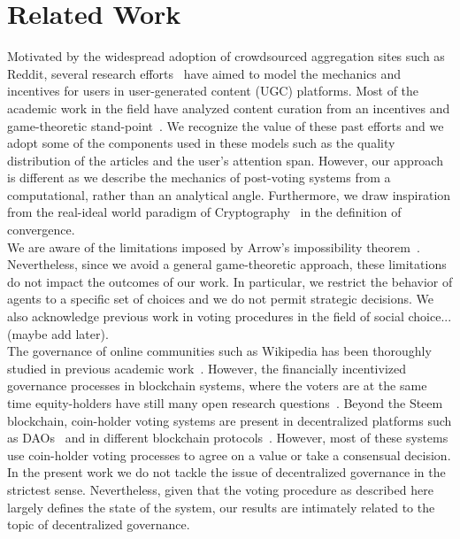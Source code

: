 \section{Related Work}
  Motivated by the widespread adoption of crowdsourced aggregation sites such as Reddit, several research efforts~\cite{askalidis2013theoretical,ghosh2011incentivizing,may2014filter} have aimed to model the mechanics and incentives for users in user-generated content (UGC) platforms.
   Most of the academic work in the field have analyzed content curation from an incentives and game-theoretic stand-point~\cite{ghosh2011incentivizing,das2010ranking,gupte2009news,may2014filter}. We recognize the value of these past efforts and we adopt some of the components used in these models such as the quality distribution of the articles and the user's attention span.
    However, our approach is different as we describe the mechanics of post-voting systems from a computational, rather than an analytical angle. Furthermore, we draw inspiration from the real-ideal world paradigm of Cryptography~\cite{lindell} in the definition of convergence.\\
  
  We are aware of the limitations imposed by Arrow's impossibility theorem~\cite{arrow1950difficulty}. Nevertheless, since we avoid a general game-theoretic approach, these limitations do not impact the outcomes of our work.
  In particular, we restrict the behavior of agents to a specific set of choices and we do not permit strategic decisions. We also acknowledge previous work in voting procedures in the field of social choice...(maybe add later).
   \\


  The governance of online communities such as Wikipedia has been thoroughly studied in previous academic work~\cite{leskovec2010governance,forte2008scaling}. However, the financially incentivized governance processes in blockchain systems, where the voters are at the same time equity-holders have still many open research questions~\cite{vitalik,ehrsam}.
   Beyond the Steem blockchain, coin-holder voting systems are present in decentralized platforms such as DAOs~\cite{darkdaos} and in different blockchain protocols~\cite{tezos}. However, most of these systems use coin-holder voting processes to agree on a value or take a consensual decision.
    In the present work we do not tackle the issue of decentralized governance in the strictest sense. Nevertheless, given that the voting procedure as described here largely defines the state of the system, our results are intimately related to the topic of decentralized governance.
  
  
